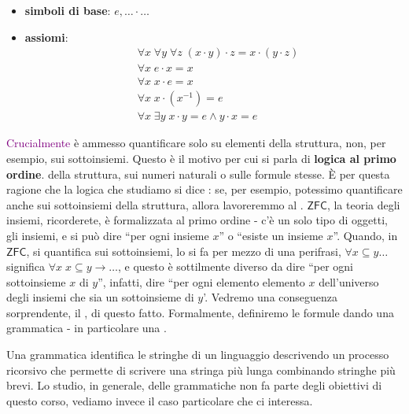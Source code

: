 \begin{example}
    \emph{}\vspace{-0.7cm}
    \begin{itemize}
        \item \textbf{simboli di base}: $e,\ldots\cdot\ldots$
        \item \textbf{assiomi}:
        \begin{align*}
            &\forall x\; \forall y\; \forall z \; (x \cdot y) \cdot z = x \cdot (y \cdot z) \\
            &\forall x\; e \cdot x = x \\
            &\forall x\; x \cdot e = x \\
            &\forall x\; x \cdot (x^{-1}) = e \\
            &\forall x\; \exists y\; x \cdot y = e \land y \cdot x = e
        \end{align*}
    \end{itemize}
\end{example}

\textcolor{purple}{Crucialmente} è ammesso quantificare solo su elementi della struttura, non, per esempio, sui sottoinsiemi. Questo è il motivo per cui si parla di \textbf{logica al primo ordine}.
della struttura, sui numeri naturali o sulle formule stesse. È per questa ragione che la logica che studiamo si dice : se, per esempio, potessimo quantificare anche sui sottoinsiemi
della struttura, allora lavoreremmo al . $\mathsf{ZFC}$, la teoria degli insiemi, ricorderete, è formalizzata al primo ordine - c'è un solo tipo di oggetti, gli insiemi, e si può dire ``per ogni insieme $x$''
o ``esiste un insieme $x$''. Quando, in $\mathsf{ZFC}$, si quantifica sui sottoinsiemi, lo si fa per mezzo di una perifrasi, $\forall x \subseteq y \ldots$ significa $\forall x \; x \subseteq y \to \ldots$, e questo è sottilmente diverso
da dire ``per ogni sottoinsieme $x$ di $y$'', infatti, dire ``per ogni elemento elemento $x$ dell'universo degli insiemi che sia un sottoinsieme di $y$'. Vedremo una conseguenza sorprendente, il , di questo fatto. 
Formalmente, definiremo le formule dando  una grammatica - in particolare una .

\medskip

Una grammatica identifica le stringhe di un linguaggio descrivendo un processo ricorsivo che permette di scrivere una stringa più lunga combinando stringhe più brevi.
Lo studio, in generale, delle grammatiche non fa parte degli obiettivi di questo corso, vediamo invece il caso particolare che ci interessa.

